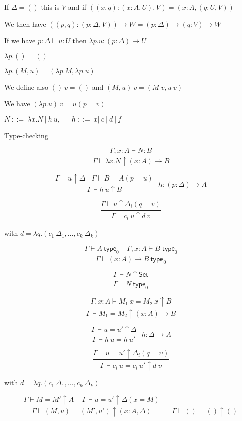 \documentclass[25pt,dvips,fleqn]{foils}
\newcommand\Set{\mathsf{Set}}
\newcommand\type{\mathsf{type}}
\begin{document}
 If $\Delta = ()$ this is $V$ and if $((x,q):(x:A,U),V) = (x:A,(q:U,V))$

 We then have $((p,q):(p:\Delta,V))\rightarrow W = (p:\Delta)\rightarrow (q:V)\rightarrow W$


 If we have $p:\Delta\vdash u:U$ then $\lambda p.u :(p:\Delta)\rightarrow U$ 

 $\lambda p.() = ()$

 $\lambda p.(M,u) = (\lambda p.M,\lambda p.u)$

 We define also $()~v = ()$ and $(M,u)~v = (M~v,u~v)$ 

 We have $(\lambda p.u)~v = u(p=v)$


 $N~::=~\lambda x.N~|~h~u,~~~~~~~h~::=~x|~c~|~d~|~f$

 Type-checking

 $$\frac{\Gamma,x:A\vdash N:B}{\Gamma\vdash \lambda x.N\uparrow (x:A)\rightarrow B}$$

 $$\frac{\Gamma\vdash u\uparrow \Delta~~~~\Gamma\vdash B = A(p=u)}{\Gamma\vdash h~u\uparrow B}
        {~~~h:(p:\Delta)\rightarrow A}$$

 $$\frac{\Gamma\vdash u\uparrow \Delta_i(q=v)}{\Gamma\vdash c_i~u\uparrow d~v}$$

with $d = \lambda q.(c_1~\Delta_1,\dots,c_k~\Delta_k)$


$$\frac{\Gamma\vdash A~\type _0~~~~~\Gamma,x:A\vdash B~\type _0}
       {\Gamma\vdash (x:A)\rightarrow B~\type _0}$$

$$\frac{\Gamma\vdash N\uparrow \Set}{\Gamma\vdash N~\type _0}$$


 $$\frac{\Gamma,x:A\vdash M_1~x = M_2~x\uparrow B}{\Gamma\vdash M_1=M_2\uparrow (x:A)\rightarrow B}$$

 $$\frac{\Gamma\vdash u=u'\uparrow \Delta}{\Gamma\vdash h~u=h~u'}~~~{h:\Delta\rightarrow A}$$

 $$\frac{\Gamma\vdash u=u'\uparrow \Delta_i(q=v)}{\Gamma\vdash c_i~u = c_i~u'\uparrow d~v}$$

with $d = \lambda q.(c_1~\Delta_1,\dots,c_k~\Delta_k)$

 $$\frac{\Gamma\vdash M=M'\uparrow A~~~~~\Gamma\vdash u=u'\uparrow \Delta(x=M)}
        {\Gamma\vdash (M,u)=(M',u')\uparrow (x:A,\Delta)}~~~~~~~
   \frac{}{\Gamma\vdash () = ()\uparrow ()}$$
\end{document}
